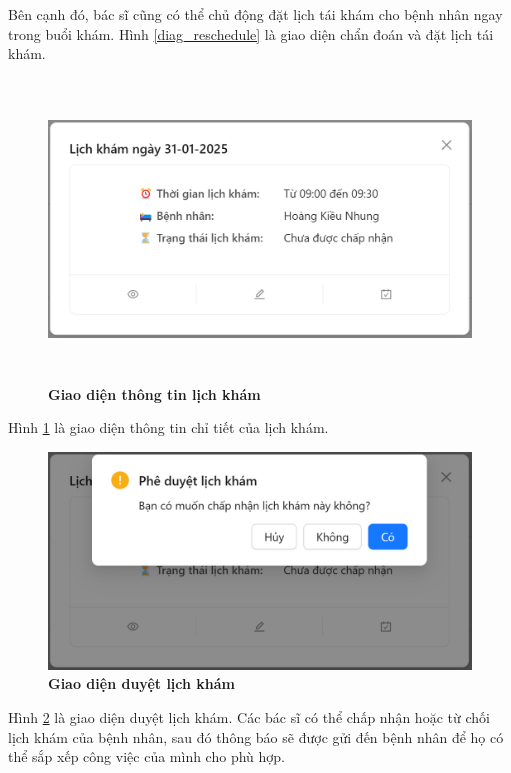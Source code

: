 Bên cạnh đó, bác sĩ cũng có thể chủ động đặt lịch tái khám cho bệnh nhân ngay trong buổi khám. Hình \ref{diag_reschedule} là giao diện chẩn đoán và đặt lịch tái khám.

\begin{figure}[H]
	\centering
	\includegraphics[width=15cm,height=8cm]{Images/doctor_ui/schedule-detail.png}
	\caption[Giao diện thông tin lịch khám]{\bfseries \fontsize{12pt}{0pt}\selectfont Giao diện thông tin lịch khám}
	\label{schedule-detail-doctor}
\end{figure}

Hình \ref{schedule-detail-doctor} là giao diện thông tin chỉ tiết của lịch khám.

\begin{figure}[H]
	\centering
	\includegraphics[width=15cm]{Images/doctor_ui/review.png}
	\caption[Giao diện duyệt lịch khám]{\bfseries \fontsize{12pt}{0pt}\selectfont Giao diện duyệt lịch khám}
	\label{review}
\end{figure}

Hình \ref{review} là giao diện duyệt lịch khám. Các bác sĩ có thể chấp nhận hoặc từ chối lịch khám của bệnh nhân, sau đó thông báo sẽ được gửi đến bệnh nhân để họ có thể sắp xếp công việc của mình cho phù hợp.

